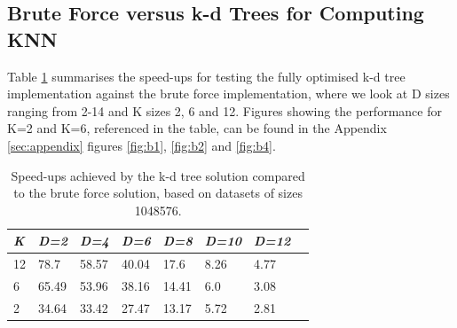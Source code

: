 \subsection{Brute Force versus k-d Trees for Computing KNN}











Table \ref{tab:total} summarises the speed-ups for testing the fully optimised k-d tree implementation against the brute force implementation, where we look at D sizes ranging from 2-14 and K sizes 2, 6 and 12. Figures showing the performance for K=2 and K=6, referenced in the table, can be found in the Appendix \ref{sec:appendix} figures \ref{fig:b1}, \ref{fig:b2} and \ref{fig:b4}.
\begin{table}[H]
\centering
\begin{tabular}{@{} *8l @{}}    \toprule
\emph{K} & \emph{D=2} & \emph{D=4} & \emph{D=6} & \emph{D=8} & \emph{D=10} & \emph{D=12} & \\\midrule
12 & 78.7 & 58.57 & 40.04 & 17.6 & 8.26 & 4.77     &   \\ 
6 & 65.49 & 53.96 & 38.16 & 14.41 & 6.0 & 3.08      & \\ 
2 &  34.64 & 33.42 & 27.47 & 13.17 & 5.72 & 2.81	& \\ \bottomrule
 \hline
\end{tabular}
\caption{Speed-ups achieved by the k-d tree solution compared to the brute force solution, based on datasets of sizes 1048576.}
\label{tab:total}
\end{table}

